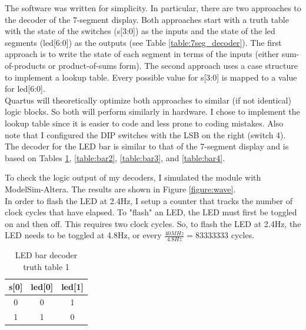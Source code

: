 \documentclass[11pt]{article}
\begin{document}
The software was written for simplicity. In particular, there are two approaches to the decoder of the 7-segment display. Both approaches start with a truth table with the state of the switches (s[3:0]) as the inputs and the state of the led segments (led[6:0]) as the outputs (see Table \ref{table:7seg_decoder}). The first approach is to write the state of each segment in terms of the inputs (either sum-of-products or product-of-sums form). The second approach uses a case structure to implement a lookup table. Every possible value for s[3:0] is mapped to a value for led[6:0]. \\

Quartus will theoretically optimize both approaches to similar (if not identical) logic blocks. So both will perform similarly in hardware. I chose to implement the lookup table since it is easier to code and less prone to coding mistakes. Also note that I configured the DIP switches with the LSB on the right (switch 4). \\


The decoder for the LED bar is similar to that of the 7-segment display and is based on Tables \ref{table:bar1}, \ref{table:bar2}, \ref{table:bar3}, and \ref{table:bar4}.


To check the logic output of my decoders, I simulated the module with ModelSim-Altera. The results are shown in Figure \ref{figure:wave}. \\

In order to flash the LED at 2.4Hz, I setup a counter that tracks the number of clock cycles that have elapsed. To "flash" an LED, the LED must first be toggled on and then off. This requires two clock cycles. So, to flash the LED at 2.4Hz, the LED needs to be toggled at 4.8Hz, or every $\frac{40MHz}{4.8Hz} = 83333333$ cycles. 


\begin{table}[h]
\centering
\begin{tabular}{|c|c|c|}
\hline
\textbf{s{[}0{]}} & \textbf{led{[}0{]}} & \textbf{led{[}1{]}} \\ \hline
0                 & 0                   & 1                   \\ \hline
1                 & 1                   & 0                   \\ \hline
\end{tabular}
\caption{LED bar decoder truth table 1}
\label{table:bar1}
\end{table}
\end{document}
